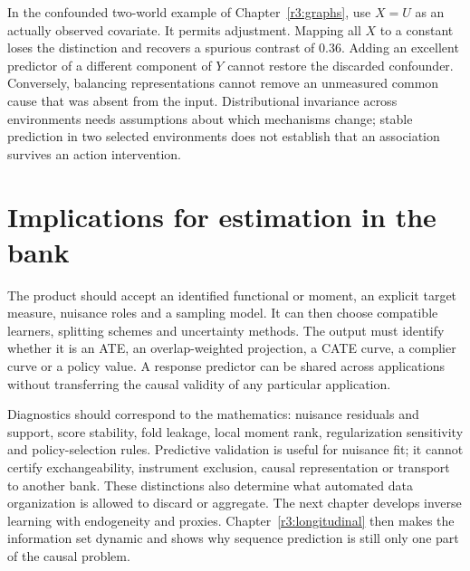 In the confounded two-world example of Chapter~\ref{r3:graphs}, use
$X=U$ as an actually observed covariate. It permits adjustment. Mapping
all $X$ to a constant loses the distinction and recovers a spurious
contrast of $0.36$. Adding an excellent predictor of a different
component of $Y$ cannot restore the discarded confounder. Conversely,
balancing representations cannot remove an unmeasured common cause
that was absent from the input. Distributional invariance across
environments needs assumptions about which mechanisms change; stable
prediction in two selected environments does not establish that an
association survives an action intervention.

\section{Implications for estimation in the bank}
\label{r3:ml-contract}
The product should accept an identified functional or moment, an
explicit target measure, nuisance roles and a sampling model. It can then
choose compatible learners, splitting schemes and uncertainty methods.
The output must identify whether it is an ATE, an overlap-weighted
projection, a CATE curve, a complier curve or a policy value. A response
predictor can be shared across applications without transferring the
causal validity of any particular application.

Diagnostics should correspond to the mathematics: nuisance residuals
and support, score stability, fold leakage, local moment rank,
regularization sensitivity and policy-selection rules. Predictive
validation is useful for nuisance fit; it cannot certify exchangeability,
instrument exclusion, causal representation or transport to another bank.
These distinctions also determine what automated data organization is
allowed to discard or aggregate. The next chapter develops inverse
learning with endogeneity and proxies. Chapter~\ref{r3:longitudinal}
then makes the information set dynamic and shows why sequence prediction
is still only one part of the causal problem.
